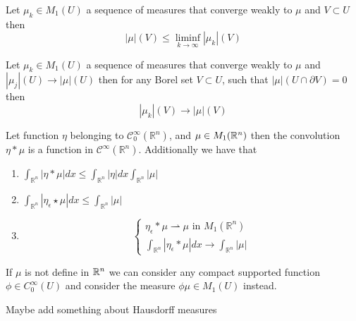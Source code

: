 \begin{theorem}
Let $\mu_k\in M_1(U)$ a sequence of measures that converge weakly to $\mu$ and $V\subset U$ then
$$
|\mu|(V) \leq \liminf _{k \rightarrow \infty}|\mu_k|(V)
$$
\end{theorem}
\begin{lemma}
Let $\mu_k\in M_1(U)$ a sequence of measures that converge weakly to $\mu$ and $|\mu_j|(U)\to|\mu|(U)$ then for any Borel set $V\subset U$, such that $|\mu|(U\cap\partial V)=0$ then
$$|\mu_k|(V)\to|\mu|(V)$$
\end{lemma}
\begin{comment}
So  basically we have i) from theorem 2.8 implies ii) and iii) dor signed measures also. the equivalence is also true  right?
\end{comment}
\begin{theorem} Let 
function $\eta$ belonging to $\mathscr{C}_0^{\infty}\left(\mathbb{R}^n\right)$, and $\mu\in M_1(\mathbb{R}^n)$ then the convolution $\eta * \mu$ is a function in $\mathscr{C}^{\infty}\left(\mathbb{R}^n\right)$. Additionally we have that
\begin{enumerate}[label=(\roman*)]
\item $\int_{\mathbb{R}^n} |\eta * \mu| d x \leq \int_{\mathbb{R}^n}|\eta| d x  \int_{\mathbb{R}^n}|\mu|$
\item $\int_{\mathbb{R}^n}\left|\eta_\epsilon \star \mu\right| d x \leq \int_{\mathbb{R}^n} |\mu|$
\item
$$
\left\{\begin{array}{l}
\eta_\epsilon * \mu\rightharpoonup \mu \text { in } M_1\left(\mathbb{R}^n\right) \\
\int_{\mathbb{R}^n}\left|\eta_\epsilon * \mu\right| d x\to \int_{\mathbb{R}^n}|\mu|
\end{array}\right.
$$
\end{enumerate}

If $\mu$ is not define in $\mathbb{R}^n$ we can consider any compact supported function $\phi \in C^\infty_0(U)$ and consider the  measure $\phi\mu\in M_1(U)$ instead.
\end{theorem}

\begin{com}
Maybe add something about Hausdorff measures
\end{com}

